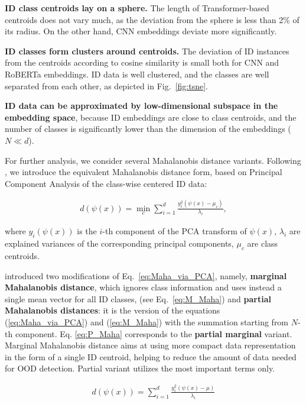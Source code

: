 \documentclass[letterpaper, final]{article} %
\begin{document}
{\bf ID class centroids lay on a sphere.} The length of Transformer-based centroids  does not vary much, as the deviation from the sphere is less than 2\% of its radius. On the other hand, CNN embeddings deviate more significantly.

{\bf ID classes form clusters around centroids.} The deviation of ID instances from the centroids according to cosine similarity is small both for CNN and RoBERTa embeddings. ID data is well clustered, and the classes are well separated from each other, as depicted in Fig.~\ref{fig:tsne}.


{\bf ID data can be approximated by low-dimensional subspace in the embedding space}, because ID embeddings are close to class centroids, and the number of classes is significantly lower than the dimension of the embeddings ($N \ll d$).

For further analysis, we consider several Mahalanobis distance variants. Following \citet*{Kamoi2020WhyIT}, we introduce the equivalent Mahalanobis distance form, based on  Principal Component Analysis of the class-wise centered ID data:


\begin{equation}
\begin{gathered}
d(\psi(x))=\min\limits_{c}\sum\limits_{i=1}^{d}\frac{y_i^2(\psi(x) - \mu_c)}{\lambda_i},
\end{gathered}
\label{eq:Maha_via_PCA}
\end{equation}

where $y_i(\psi(x))$ is the $i$-th component of the PCA transform of $\psi(x)$, $\lambda_i$ are explained variances of the corresponding principal components, $\mu_c$ are class centroids.

\citet*{Kamoi2020WhyIT} introduced two modifications of Eq.~\ref{eq:Maha_via_PCA}, namely, {\bf marginal Mahalanobis distance}, which  ignores class information and uses instead a single mean vector for all ID classes, (see Eq.~\ref{eq:M_Maha}) and {\bf partial Mahalanobis distances}: it is the version of the equations (\ref{eq:Maha_via_PCA}) and (\ref{eq:M_Maha}) with the summation starting from $N$-th component. Eq. \ref{eq:P_Maha} corresponds to the {\bf partial marginal} variant. Marginal Mahalanobis distance aims at using more compact data representation in the form of a single ID centroid, helping to reduce the amount of data needed for OOD detection. Partial variant utilizes  the most important terms only.

\begin{equation}
\begin{gathered}
d(\psi(x))=\sum\limits_{i=1}^{d}\frac{y_i^2(\psi(x)-\mu)}{\lambda_i}
\end{gathered}
\label{eq:M_Maha}
\end{equation}
\end{document}
